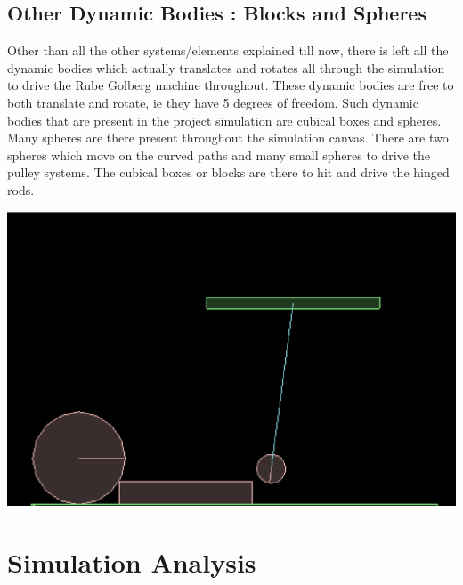 \documentclass[11pt]{article}
\begin{document}
\subsection{Other Dynamic Bodies : Blocks and Spheres}
Other than all the other systems/elements explained till now, there is left all the dynamic bodies which actually translates and rotates all through the simulation to drive the Rube Golberg machine throughout. These dynamic bodies are free to both translate and rotate, ie they have 5 degrees of freedom. Such dynamic bodies that are present in the project simulation are cubical boxes and spheres. Many spheres are there present throughout the simulation canvas. There are two spheres which move on the curved paths and many small spheres to drive the pulley systems. The cubical boxes or blocks are there to hit and drive the hinged rods.
\begin{center}
\includegraphics[scale=0.5]{sphere}
\end{center}  
\section{Simulation Analysis}
\end{document}

